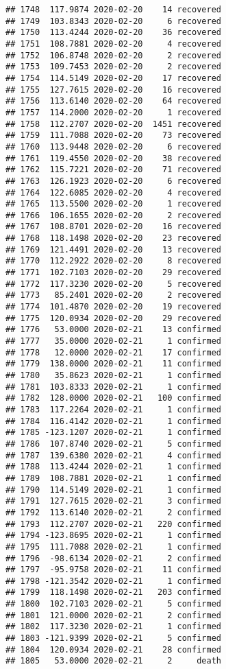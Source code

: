 \documentclass[
]{article}
\begin{document}
\begin{verbatim}
## 1748  117.9874 2020-02-20    14 recovered
## 1749  103.8343 2020-02-20     6 recovered
## 1750  113.4244 2020-02-20    36 recovered
## 1751  108.7881 2020-02-20     4 recovered
## 1752  106.8748 2020-02-20     2 recovered
## 1753  109.7453 2020-02-20     2 recovered
## 1754  114.5149 2020-02-20    17 recovered
## 1755  127.7615 2020-02-20    16 recovered
## 1756  113.6140 2020-02-20    64 recovered
## 1757  114.2000 2020-02-20     1 recovered
## 1758  112.2707 2020-02-20  1451 recovered
## 1759  111.7088 2020-02-20    73 recovered
## 1760  113.9448 2020-02-20     6 recovered
## 1761  119.4550 2020-02-20    38 recovered
## 1762  115.7221 2020-02-20    71 recovered
## 1763  126.1923 2020-02-20     6 recovered
## 1764  122.6085 2020-02-20     4 recovered
## 1765  113.5500 2020-02-20     1 recovered
## 1766  106.1655 2020-02-20     2 recovered
## 1767  108.8701 2020-02-20    16 recovered
## 1768  118.1498 2020-02-20    23 recovered
## 1769  121.4491 2020-02-20    13 recovered
## 1770  112.2922 2020-02-20     8 recovered
## 1771  102.7103 2020-02-20    29 recovered
## 1772  117.3230 2020-02-20     5 recovered
## 1773   85.2401 2020-02-20     2 recovered
## 1774  101.4870 2020-02-20    19 recovered
## 1775  120.0934 2020-02-20    29 recovered
## 1776   53.0000 2020-02-21    13 confirmed
## 1777   35.0000 2020-02-21     1 confirmed
## 1778   12.0000 2020-02-21    17 confirmed
## 1779  138.0000 2020-02-21    11 confirmed
## 1780   35.8623 2020-02-21     1 confirmed
## 1781  103.8333 2020-02-21     1 confirmed
## 1782  128.0000 2020-02-21   100 confirmed
## 1783  117.2264 2020-02-21     1 confirmed
## 1784  116.4142 2020-02-21     1 confirmed
## 1785 -123.1207 2020-02-21     1 confirmed
## 1786  107.8740 2020-02-21     5 confirmed
## 1787  139.6380 2020-02-21     4 confirmed
## 1788  113.4244 2020-02-21     1 confirmed
## 1789  108.7881 2020-02-21     1 confirmed
## 1790  114.5149 2020-02-21     1 confirmed
## 1791  127.7615 2020-02-21     3 confirmed
## 1792  113.6140 2020-02-21     2 confirmed
## 1793  112.2707 2020-02-21   220 confirmed
## 1794 -123.8695 2020-02-21     1 confirmed
## 1795  111.7088 2020-02-21     1 confirmed
## 1796  -98.6134 2020-02-21     2 confirmed
## 1797  -95.9758 2020-02-21    11 confirmed
## 1798 -121.3542 2020-02-21     1 confirmed
## 1799  118.1498 2020-02-21   203 confirmed
## 1800  102.7103 2020-02-21     5 confirmed
## 1801  121.0000 2020-02-21     2 confirmed
## 1802  117.3230 2020-02-21     1 confirmed
## 1803 -121.9399 2020-02-21     5 confirmed
## 1804  120.0934 2020-02-21    28 confirmed
## 1805   53.0000 2020-02-21     2     death

\end{verbatim}
\end{document}

